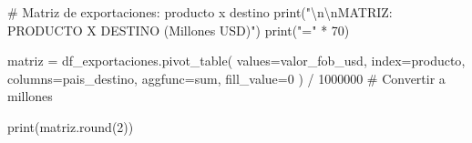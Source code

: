 \documentclass[
  doc,
  floatsintext,
  longtable,
  a4paper,
  nolmodern,
  notxfonts,
  notimes,
  12pt,
  colorlinks=true,linkcolor=blue,citecolor=blue,urlcolor=blue]{apa7}
\newenvironment{Shaded}{\begin{snugshade}}{\end{snugshade}}
\newcommand{\BuiltInTok}[1]{\textcolor[rgb]{0.00,0.23,0.31}{#1}}
\newcommand{\CharTok}[1]{\textcolor[rgb]{0.13,0.47,0.30}{#1}}
\newcommand{\CommentTok}[1]{\textcolor[rgb]{0.37,0.37,0.37}{#1}}
\newcommand{\DecValTok}[1]{\textcolor[rgb]{0.68,0.00,0.00}{#1}}
\newcommand{\NormalTok}[1]{\textcolor[rgb]{0.00,0.23,0.31}{#1}}
\newcommand{\OperatorTok}[1]{\textcolor[rgb]{0.37,0.37,0.37}{#1}}
\newcommand{\StringTok}[1]{\textcolor[rgb]{0.13,0.47,0.30}{#1}}
\begin{document}
\begin{Shaded}
\begin{Highlighting}[]
\CommentTok{\# Matriz de exportaciones: producto x destino}
\BuiltInTok{print}\NormalTok{(}\StringTok{"}\CharTok{\textbackslash{}n\textbackslash{}n}\StringTok{MATRIZ: PRODUCTO X DESTINO (Millones USD)"}\NormalTok{)}
\BuiltInTok{print}\NormalTok{(}\StringTok{"="} \OperatorTok{*} \DecValTok{70}\NormalTok{)}

\NormalTok{matriz }\OperatorTok{=}\NormalTok{ df\_exportaciones.pivot\_table(}
\NormalTok{    values}\OperatorTok{=}\StringTok{\textquotesingle{}valor\_fob\_usd\textquotesingle{}}\NormalTok{,}
\NormalTok{    index}\OperatorTok{=}\StringTok{\textquotesingle{}producto\textquotesingle{}}\NormalTok{,}
\NormalTok{    columns}\OperatorTok{=}\StringTok{\textquotesingle{}pais\_destino\textquotesingle{}}\NormalTok{,}
\NormalTok{    aggfunc}\OperatorTok{=}\StringTok{\textquotesingle{}sum\textquotesingle{}}\NormalTok{,}
\NormalTok{    fill\_value}\OperatorTok{=}\DecValTok{0}
\NormalTok{) }\OperatorTok{/} \DecValTok{1000000}  \CommentTok{\# Convertir a millones}

\BuiltInTok{print}\NormalTok{(matriz.}\BuiltInTok{round}\NormalTok{(}\DecValTok{2}\NormalTok{))}
\end{Highlighting}
\end{Shaded}
\end{document}
